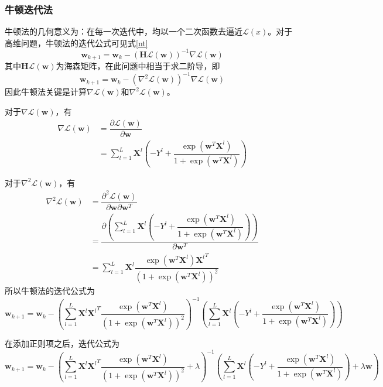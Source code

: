 \subsubsection{牛顿迭代法}

牛顿法的几何意义为：在每一次迭代中，均以一个二次函数去逼近$\mathcal{L}(x)$。对于高维问题，牛顿法的迭代公式可见式\ref{nt}
\begin{equation}
    \label{nt}
    \mathbf{w}_{k+1}=\mathbf{w}_k-\left(\mathbf{H}\mathcal{L}(\mathbf{w})\right)^{-1}\nabla \mathcal{L}(\mathbf{w})
\end{equation}
其中$\mathbf{H}\mathcal{L}(\mathbf{w})$为海森矩阵，在此问题中相当于求二阶导，即
\begin{equation}
    \mathbf{w}_{k+1}=\mathbf{w}_k-\left(\nabla^2\mathcal{L}(\mathbf{w})\right)^{-1}\nabla \mathcal{L}(\mathbf{w})
\end{equation}
因此牛顿法关键是计算$\nabla \mathcal{L}(\mathbf{w})$和$\nabla^2\mathcal{L}(\mathbf{w})$。

对于$\nabla \mathcal{L}(\mathbf{w})$，有
\begin{align}
    \nabla\mathcal{L}(\mathbf{w})
    &= \dfrac{\partial\mathcal{L}(\mathbf{w})}{\partial\mathbf{w}} \\
    &= \sum^L_{l=1}\mathbf{X}^l\left(-Y^l+\dfrac{\exp\left(\mathbf{w}^T\mathbf{X}^l\right)}{1+\exp\left(\mathbf{w}^T\mathbf{X}^l\right)}\right)
\end{align}

对于$\nabla^2\mathcal{L}(\mathbf{w})$，有
\begin{align}
    \nabla^2\mathcal{L}(\mathbf{w})
    &= \dfrac{\partial^2\mathcal{L}(\mathbf{w})}{\partial\mathbf{w}\partial\mathbf{w}^T} \\
    &= \dfrac{\partial\left(\sum\limits^L_{l=1}\mathbf{X}^l\left(-Y^l+\dfrac{\exp\left(\mathbf{w}^T\mathbf{X}^l\right)}{1+\exp\left(\mathbf{w}^T\mathbf{X}^l\right)}\right)\right)}{\partial\mathbf{w}^T} \\
    &= \sum^L_{l=1}\mathbf{X}^l\dfrac{\exp\left(\mathbf{w}^T\mathbf{X}^l\right){\mathbf{X}^l}^T}{\left(1+\exp\left(\mathbf{w}^T\mathbf{X}^l\right)\right)^2}
\end{align}
所以牛顿法的迭代公式为
\begin{equation}
    \mathbf{w}_{k+1}=\mathbf{w}_k-\left(\sum^L_{l=1}\mathbf{X}^l{\mathbf{X}^l}^T\dfrac{\exp\left(\mathbf{w}^T\mathbf{X}^l\right)}{\left(1+\exp\left(\mathbf{w}^T\mathbf{X}^l\right)\right)^2}\right)^{-1}\left(\sum^L_{l=1}\mathbf{X}^l\left(-Y^l+\dfrac{\exp\left(\mathbf{w}^T\mathbf{X}^l\right)}{1+\exp\left(\mathbf{w}^T\mathbf{X}^l\right)}\right)\right)
\end{equation}

在添加正则项之后，迭代公式为
\begin{equation}
    \mathbf{w}_{k+1}=\mathbf{w}_k-\left(\sum^L_{l=1}\mathbf{X}^l{\mathbf{X}^l}^T\dfrac{\exp\left(\mathbf{w}^T\mathbf{X}^l\right)}{\left(1+\exp\left(\mathbf{w}^T\mathbf{X}^l\right)\right)^2}+\lambda\right)^{-1}\left(\sum^L_{l=1}\mathbf{X}^l\left(-Y^l+\dfrac{\exp\left(\mathbf{w}^T\mathbf{X}^l\right)}{1+\exp\left(\mathbf{w}^T\mathbf{X}^l\right)}\right)+\lambda\mathbf{w}\right)
\end{equation}
